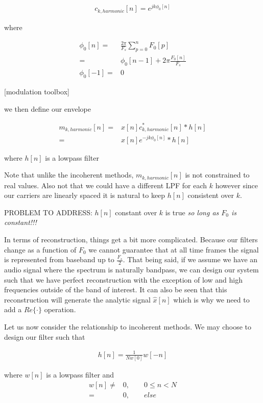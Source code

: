 \documentclass [11pt, proquest] {uwthesis}[2015/03/03]
\begin{document}
\begin{align}
c_{k,harmonic}[n] = e^{jk\phi_0 [n]}
\end{align}

where 

\begin{align}
\phi_0[n] =& \frac{2\pi}{F_s} \sum_{p=0}^{n} F_0[p] \nonumber \\
=& \phi_0[n - 1] + 2\pi \frac{F_0[n]}{F_s} \\
\phi_0[-1] =& 0 \nonumber
\end{align}

[modulation toolbox]

we then define our envelope

\begin{align}
m_{k,harmonic}[n] =& x[n] c_{k,harmonic}^*[n] * h[n] \nonumber \\
=& x[n] e^{-jk\phi_0 [n]} * h[n]
\end{align}

where $h[n]$ is a lowpass filter

Note that unlike the incoherent methods, $m_{k,harmonic}[n]$ is not constrained to real values.  Also not that we could have a different LPF for each $k$ however since our carriers are linearly spaced it is natural to keep $h[n]$ consistent over $k$.

PROBLEM TO ADDRESS: $h[n]$ constant over $k$ is true \textit{so long as $F_0$ is constant!!!}

In terms of reconstruction, things get a bit more complicated.  Because our filters change as a function of $F_0$ we cannot guarantee that at all time frames the signal is represented from baseband up to $\frac{F_s}{2}$.  That being said, if we assume we have an audio signal where the spectrum is naturally bandpass, we can design our system such that we have perfect reconstruction with the exception of low and high frequencies outside of the band of interest.  It can also be seen that this reconstruction will generate the analytic signal $\widehat{x}[n]$ which is why we need to add a $Re\{\cdot\}$ operation.

Let us now consider the relationship to incoherent methods.  We may choose to design our filter such that

\begin{align}
h[n] = \frac{1}{Nw[0]} w[-n]
\end{align}

where $w[n]$ is a lowpass filter and 
\begin{align}
w[n] \neq& 0, \qquad 0 \leq n < N \nonumber \\
=& 0, \qquad else
\end{align}
\end{document}
